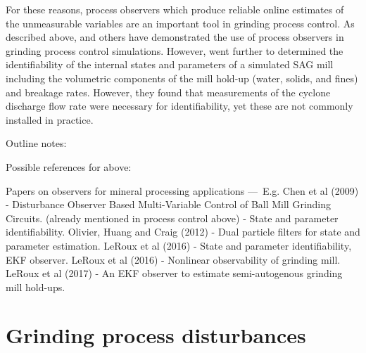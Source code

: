For these reasons, process observers which produce reliable online estimates of the unmeasurable variables are an important tool in grinding process control.  As described above, \cite{le_roux_throughput_2016} and others have demonstrated the use of process observers in grinding process control simulations. However, \cite{le_roux_state_2016} went further to determined the identifiability of the internal states and parameters of a simulated SAG mill including the volumetric components of the mill hold-up (water, solids, and fines) and breakage rates. However, they found that measurements of the cyclone discharge flow rate were necessary for identifiability, yet these are not commonly installed in practice.

Outline notes:

\begin{outline}
\end{outline}

Possible references for above:
\begin{outline}
	\1 Papers on observers for mineral processing applications — E.g. 
	\2 Chen et al (2009) - Disturbance Observer Based Multi-Variable Control of Ball Mill Grinding Circuits. (already mentioned in process control above)%
	\2 \cite{le_roux_state_2016} - State and parameter identifiability. 
	\2 Olivier, Huang and Craig (2012) - Dual particle filters for state and parameter estimation.
	\2 LeRoux et al (2016) - State and parameter identifiability, EKF observer.
	\2 LeRoux et al (2016) - Nonlinear observability of grinding mill.
	\2 LeRoux et al (2017) - An EKF observer to estimate semi-autogenous grinding mill hold-ups.
\end{outline}

\section*{Grinding process disturbances}

